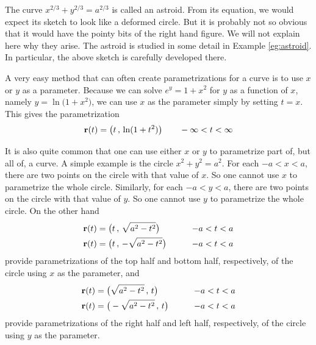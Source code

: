 \begin{eg}[Parametrization of  $\frac{x^2}{a^2}+\frac{y^2}{b^2}=1$ and of
$x^{2/3}+y^{2/3}=a^{2/3}$]
\begin{wfig}
\begin{center}
\end{center}
\end{wfig}
The curve $x^{2/3}+y^{2/3}=a^{2/3}$ is called an astroid. From its equation,
we would expect its sketch to look like a deformed circle. But it is probably 
not so obvious that it would have the pointy bits of the right hand figure.
We will not explain here why they arise. The astroid is studied in some 
detail in Example \ref{eg:astroid}.
In particular, the above sketch is carefully developed there.  
 
\end{eg}

\begin{eg}[Parametrization of  $e^y=1+x^2$]\label{eg:paramMessy}
A very easy method that can often create parametrizations for a curve is to use $x$ or $y$ as a parameter. Because we can solve $e^y=1+x^2$ for $y$ as a function of $x$, namely $y=\ln\big(1+x^2\big)$, we can use $x$ as 
the parameter simply by setting $t=x$. This gives the parametrization
\begin{equation*}
\mathbf{r}(t) = \big(t\,,\,\ln(1+t^2)\big)\qquad -\infty<t<\infty
\end{equation*}  
\end{eg}

\begin{eg}[Parametrization of  $x^2+y^2=a^2$, again]\label{eg:paramCircleC}
It is also quite common that one can use either $x$ or $y$ to parametrize part of, but all of, a curve. A simple example is the circle $x^2+y^2=a^2$.
For each $-a<x<a$, there are two points on the circle with that value of $x$.
So one cannot use $x$ to parametrize the whole circle.
Similarly, for each $-a<y<a$, there are two points on the circle with that value of $y$. So one cannot use $y$ to parametrize the whole circle. On the other 
hand
\begin{alignat*}{3}
\mathbf{r}(t) &= \big(t\,,\,\sqrt{a^2-t^2}\big)\qquad &-a<t<a \\
\mathbf{r}(t) &= \big(t\,,\,-\sqrt{a^2-t^2}\big)\qquad &-a<t<a
\end{alignat*}
provide parametrizations of the top half and bottom half, respectively,
of the circle using $x$ as the parameter, and
\begin{alignat*}{3}
\mathbf{r}(t) &= \big(\sqrt{a^2-t^2}\,,\,t\big)\qquad &-a<t<a \\
\mathbf{r}(t) &= \big(-\sqrt{a^2-t^2}\,,\,t\big)\qquad &-a<t<a
\end{alignat*}
provide parametrizations of the right half and left half, respectively,
of the circle using $y$ as the parameter.
\end{eg}

